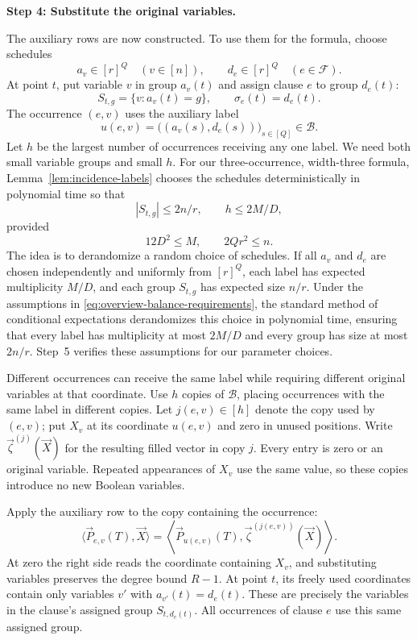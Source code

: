 \documentclass[11pt,reqno]{amsart}
\numberwithin{equation}{section}
\theoremstyle{definition}\newtheorem{definition}[theorem]{Definition}
\theoremstyle{remark}\newtheorem{remark}[theorem]{Remark}
\renewcommand{\le}{\leqslant}
\begin{document}
\medskip\noindent
\textbf{Step 4: Substitute the original variables.}\par\nobreak
\smallskip\noindent
The auxiliary rows are now constructed. To use them for the
formula, choose schedules
\[
 a_v\in[r]^Q\quad(v\in[n]),\qquad
 d_e\in[r]^Q\quad(e\in\mathcal F).
\]
At point $t$, put variable $v$ in group $a_v(t)$ and assign
clause $e$ to group $d_e(t)$:
\[
 S_{t,g}=\{v:a_v(t)=g\},\qquad \sigma_e(t)=d_e(t).
\]
The occurrence $(e,v)$ uses the auxiliary label
\[
 u(e,v)=\bigl((a_v(s),d_e(s))\bigr)_{s\in[Q]}\in\mathcal B.
\]
Let $h$ be the largest number of occurrences receiving any one
label. We need both small variable groups and small $h$.
For our three-occurrence, width-three formula,
Lemma~\ref{lem:incidence-labels} chooses the schedules
deterministically in polynomial time so that
\[
 |S_{t,g}|\le2n/r,\qquad h\le2M/D,
\]
provided
\begin{equation}\label{eq:overview-balance-requirements}
 12D^2\le M,\qquad 2Qr^2\le n.
\end{equation}
The idea is to derandomize a random choice of schedules. If all
$a_v$ and $d_e$ are chosen independently and uniformly from
$[r]^Q$, each label has expected multiplicity $M/D$, and each
group $S_{t,g}$ has expected size $n/r$. Under the assumptions
in \eqref{eq:overview-balance-requirements}, the standard method
of conditional expectations derandomizes this choice in polynomial
time, ensuring that every label has multiplicity at most $2M/D$
and every group has size at most $2n/r$. Step~5 verifies these
assumptions for our parameter choices.

Different occurrences can receive the same label while requiring
different original variables at that coordinate. Use $h$ copies
of $\mathcal B$, placing occurrences with the same label in
different copies. Let $j(e,v)\in[h]$ denote the copy used by
$(e,v)$; put $X_v$ at its coordinate $u(e,v)$ and zero in unused
positions. Write $\vec\zeta^{(j)}(\vec X)$ for the resulting filled
vector in copy $j$. Every entry is zero or an original variable.
Repeated appearances of $X_v$ use the same value, so these copies
introduce no new Boolean variables.

Apply the auxiliary row to the copy containing the occurrence:
\begin{equation}\label{eq:overview-transferred-row}
 \langle\vec P_{e,v}(T),\vec X\rangle
 =\left\langle\vec P_{u(e,v)}(T),
                  \vec\zeta^{(j(e,v))}(\vec X)\right\rangle.
\end{equation}
At zero the right side reads the coordinate containing $X_v$,
and substituting variables preserves the degree bound $R-1$.
At point $t$, its freely used coordinates contain only variables
$v'$ with $a_{v'}(t)=d_e(t)$. These are precisely the variables
in the clause's assigned group $S_{t,d_e(t)}$.
All occurrences of clause $e$ use this same assigned group.
\end{document}
